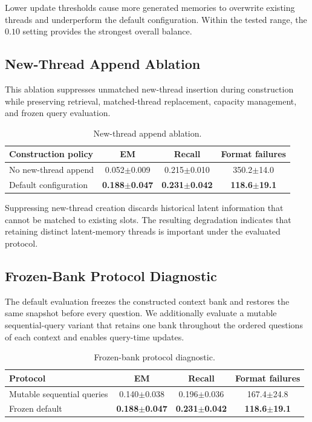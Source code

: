 \documentclass[letterpaper]{article}
\begin{document}
Lower update thresholds cause more generated memories to overwrite existing
threads and underperform the default configuration. Within the tested range,
the \(0.10\) setting provides the strongest overall balance.


\subsection{New-Thread Append Ablation}
\label{sec:supp-append}

This ablation suppresses unmatched new-thread insertion during construction
while preserving retrieval, matched-thread replacement, capacity management,
and frozen query evaluation.

\begin{table}[t]
\centering
\begin{tabular}{lccc}
\toprule
Construction policy & EM & Recall & Format failures\\
\midrule
No new-thread append &
0.052$\pm$0.009 &
0.215$\pm$0.010 &
350.2$\pm$14.0\\

Default configuration &
\textbf{0.188$\pm$0.047} &
\textbf{0.231$\pm$0.042} &
\textbf{118.6$\pm$19.1}\\
\bottomrule
\end{tabular}
\caption{New-thread append ablation.}
\label{tab:supp-append}
\end{table}


Suppressing new-thread creation discards historical latent information that
cannot be matched to existing slots. The resulting degradation indicates
that retaining distinct latent-memory threads is important under the
evaluated protocol.


\subsection{Frozen-Bank Protocol Diagnostic}
\label{sec:supp-frozen}

The default evaluation freezes the constructed context bank and restores the
same snapshot before every question. We additionally evaluate a mutable
sequential-query variant that retains one bank throughout the ordered
questions of each context and enables query-time updates.

\begin{table}[t]
\centering
\begin{tabular}{lccc}
\toprule
Protocol & EM & Recall & Format failures\\
\midrule
Mutable sequential queries &
0.140$\pm$0.038 &
0.196$\pm$0.036 &
167.4$\pm$24.8\\

Frozen default &
\textbf{0.188$\pm$0.047} &
\textbf{0.231$\pm$0.042} &
\textbf{118.6$\pm$19.1}\\
\bottomrule
\end{tabular}
\caption{Frozen-bank protocol diagnostic.}
\label{tab:supp-frozen}
\end{table}
\end{document}
